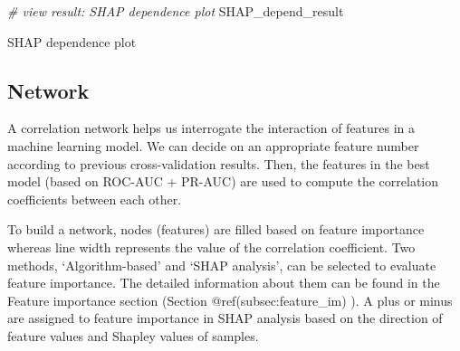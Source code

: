 \documentclass[]{article}
\newcommand{\hlcom}[1]{\textcolor[rgb]{0.502,0.502,0.502}{\textit{#1}}}%
\newcommand{\hlstd}[1]{\textcolor[rgb]{0.251,0.251,0.251}{#1}}%
\newenvironment{Shaded}{\begin{myshaded}}{\end{myshaded}}
\newcommand{\CommentTok}[1]{\hlcom{#1}}
\newcommand{\NormalTok}[1]{\hlstd{#1}}
\begin{document}
\begin{Shaded}
\begin{Highlighting}[]
\CommentTok{# view result: SHAP dependence plot}
\NormalTok{SHAP_depend_result }
\end{Highlighting}
\end{Shaded}

\label{fig:unnamed-chunk-68}SHAP dependence plot

\hypertarget{network}{%
\subsection{Network}\label{network}}

A correlation network helps us interrogate the interaction of features in a machine learning model. We can decide on an appropriate feature number according to previous cross-validation results. Then, the features in the best model (based on ROC-AUC + PR-AUC) are used to compute the correlation coefficients between each other.

To build a network, nodes (features) are filled based on feature importance whereas line width represents the value of the correlation coefficient. Two methods, `Algorithm-based' and `SHAP analysis', can be selected to evaluate feature importance. The detailed information about them can be found in the Feature importance section (Section @ref(subsec:feature\_im) ). A plus or minus are assigned to feature importance in SHAP analysis based on the direction of feature values and Shapley values of samples.
\end{document}
